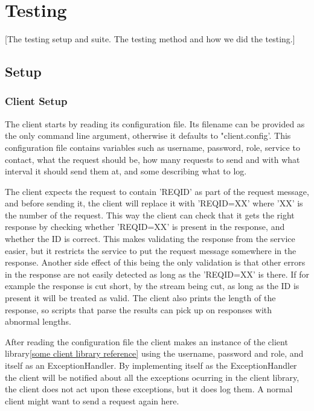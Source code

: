 \section{Testing}\label{Testing}
    [The testing setup and suite. The testing method and how we did the testing.]
    
    
    \subsection{Setup}\label{Testing:Setup}
        \subsubsection{Client Setup}\label{Testing:Setup:Client}
            The client starts by reading its configuration file. Its filename can be provided as the only command line argument, otherwise it defaults to "client.config'. This configuration file contains variables such as username, password, role, service to contact, what the request should be, how many requests to send and with what interval it should send them at, and some describing what to log.

            The client expects the request to contain '{REQID}' as part of the request message, and before sending it, the client will replace it with '{REQID=XX}' where 'XX' is the number of the request. This way the client can check that it gets the right response by checking whether '{REQID=XX}' is present in the response, and whether the ID is correct. This makes validating the response from the service easier, but it restricts the service to put the request message somewhere in the response. Another side effect of this being the only validation is that other errors in the response are not easily detected as long as the '{REQID=XX}' is there. If for example the response is cut short, by the stream being cut, as long as the ID is present it will be treated as valid. The client also prints the length of the response, so scripts that parse the results can pick up on responses with abnormal lengths.

            After reading the configuration file the client makes an instance of the client library\ref{some client library reference} using the username, password and role, and itself as an ExceptionHandler. By implementing itself as the ExceptionHandler the client will be notified about all the exceptions ocurring in the client library, the client does not act upon these exceptions, but it does log them. A normal client might want to send a request again here.
            
